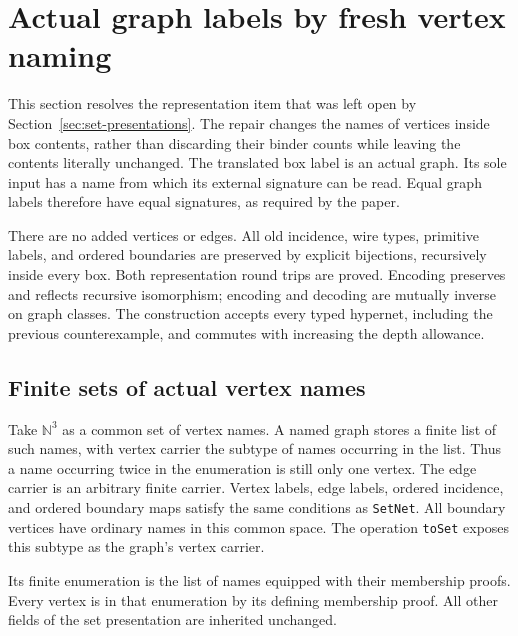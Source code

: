 \section{Actual graph labels by fresh vertex naming}
\label{sec:paper-encoding}

This section resolves the representation item that was left open by
Section~\ref{sec:set-presentations}. The repair changes the names of vertices
inside box contents, rather than discarding their binder counts while leaving
the contents literally unchanged. The translated box label is an actual graph.
Its sole input has a name from which its external signature can be read.
Equal graph labels therefore have equal signatures, as required by the paper.

There are no added vertices or edges. All old incidence, wire types, primitive
labels, and ordered boundaries are preserved by explicit bijections, recursively
inside every box. Both representation round trips are proved. Encoding preserves
and reflects recursive isomorphism; encoding and decoding are mutually inverse
on graph classes. The construction accepts every typed hypernet, including the
previous counterexample, and commutes with increasing the depth allowance.

\subsection{Finite sets of actual vertex names}
\begin{definition}
Take $\mathbb N^3$ as a common set of vertex names. A named graph stores a finite
list of such names, with vertex carrier the subtype of names occurring in the
list. Thus a name occurring twice in the enumeration is still only one vertex.
The edge carrier is an arbitrary finite carrier. Vertex labels, edge labels,
ordered incidence, and ordered boundary maps satisfy the same conditions as
\texttt{SetNet}. All boundary vertices have ordinary names in this common space.
The operation \texttt{toSet} exposes this subtype as the graph's vertex carrier.
\end{definition}
Its finite enumeration is the list of names equipped with their membership
proofs. Every vertex is in that enumeration by its defining membership proof.
All other fields of the set presentation are inherited unchanged.


